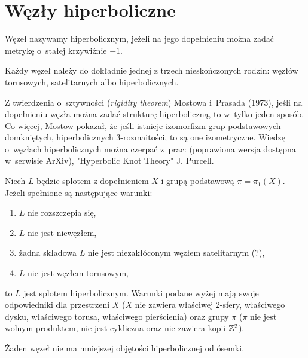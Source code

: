 \section{Węzły hiperboliczne} %
\label{sec:hyperbolic}
\begin{definition}
    Węzeł nazywamy hiperbolicznym, jeżeli na jego dopełnieniu można zadać metrykę o~stałej krzywiźnie $-1$.
\end{definition}

\begin{theorem}
    Każdy węzeł należy do dokładnie jednej z trzech nieskończonych rodzin: węzłów torusowych, satelitarnych albo hiperbolicznych.
\end{theorem}

Z twierdzenia o~sztywności (\emph{rigidity theorem}) Mostowa i~Prasada (1973), jeśli na dopełnieniu węzła można zadać strukturę hiperboliczną, to w~tylko jeden sposób.
Co więcej, Mostow pokazał, że jeśli istnieje izomorfizm grup podstawowych domkniętych, hiperbolicznych 3-rozmaitości, to są one izometryczne.
Wiedzę o~węzłach hiperbolicznych można czerpać z~prac: \cite{weeks05} (poprawiona wersja dostępna w~serwisie ArXiv), "Hyperbolic Knot Theory" J. Purcell.

\begin{proposition}
    Niech $L$ będzie splotem z dopełnieniem $X$ i grupą podstawową $\pi = \pi_1(X)$.
    Jeżeli spełnione są następujące warunki:
    \begin{enumerate}
    \item $L$ nie rozszczepia się,
    \item $L$ nie jest niewęzłem,
    \item żadna składowa $L$ nie jest niezakłóconym węzłem satelitarnym (?),
    \item $L$ nie jest węzłem torusowym,
    \end{enumerate}
    to $L$ jest splotem hiperbolicznym.
    Warunki podane wyżej mają swoje odpowiedniki dla przestrzeni $X$ ($X$ nie zawiera właściwej 2-sfery, właściwego dysku, właściwego torusa, właściwego pierścienia) oraz grupy $\pi$ ($\pi$ nie jest wolnym produktem, nie jest cykliczna oraz nie zawiera kopii $\mathbb Z^2$).
\end{proposition}

\begin{proposition}
    Żaden węzeł nie ma mniejszej objętości hiperbolicznej od ósemki.
\end{proposition}

